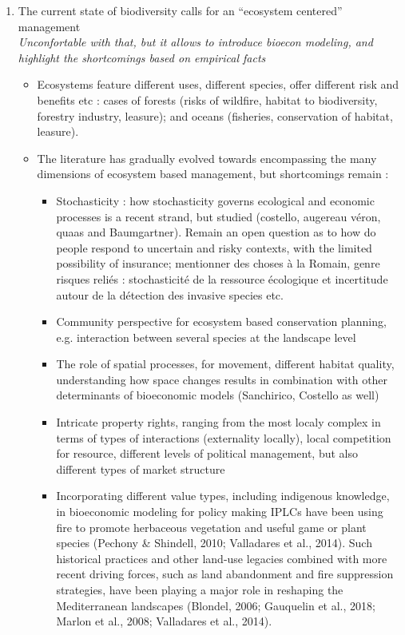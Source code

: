 \begin{enumerate}
\item The current state of biodiversity calls for an ``ecosystem centered'' management\\
\textit{Unconfortable with that, but it allows to introduce bioecon modeling, and highlight the shortcomings based on empirical facts}
\begin{itemize}
\item Ecosystems feature different uses, different species, offer different risk and benefits etc : cases of forests (risks of wildfire, habitat to biodiversity, forestry industry, leasure); and oceans (fisheries, conservation of habitat, leasure).
\item The literature has gradually evolved towards encompassing the many dimensions of ecosystem based management, but shortcomings remain : 
\begin{itemize}
\item Stochasticity : how stochasticity governs ecological and economic processes is a recent strand, but studied (costello, augereau véron, quaas and Baumgartner). Remain an open question as to how do people respond to uncertain and risky contexts, with the limited possibility of insurance; mentionner des choses à la Romain, genre risques reliés : stochasticité de la ressource écologique et incertitude autour de la détection des invasive species etc. 
\item Community perspective for ecosystem based conservation planning, e.g. interaction between several species at the landscape level
\item The role of spatial processes, for movement, different habitat quality, understanding how space changes results in combination with other determinants of bioeconomic models (Sanchirico, Costello as well)
\item Intricate property rights, ranging from the most localy complex in terms of types of interactions (externality locally), local competition for resource, different levels of political management, but also different types of market structure

\item Incorporating different value types, including indigenous knowledge, in bioeconomic modeling for policy making
IPLCs have been using fire to promote herbaceous vegetation
and useful game or plant species (Pechony \& Shindell,
2010; Valladares et al., 2014). Such historical practices and
other land-use legacies combined with more recent driving
forces, such as land abandonment and fire suppression
strategies, have been playing a major role in reshaping the
Mediterranean landscapes (Blondel, 2006; Gauquelin et al.,
2018; Marlon et al., 2008; Valladares et al., 2014).


\end{itemize}
\end{itemize}
\end{enumerate}
